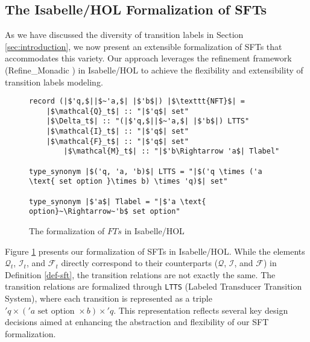 \documentclass[a4paper,UKenglish,cleveref, autoref, anonymous, thm-restate]{lipics-v2021}
\begin{document}





\subsection{The Isabelle/HOL Formalization of SFTs}

As we have discussed the diversity of transition labels in Section \ref{sec:introduction}, we now present an extensible formalization of SFTs that accommodates this variety. Our approach leverages the refinement framework (Refine\_Monadic \cite{Refine_Monadic-AFP}) in Isabelle/HOL to achieve the flexibility and extensibility of transition labels modeling.

\begin{figure}[hbt!]
	\begin{lstlisting}
record (|$'q,$||$~'a,$| |$'b$|) |$\texttt{NFT}$| =
	|$\mathcal{Q}_t$| :: "|$'q$| set"
	|$\Delta_t$| :: "(|$'q,$||$~'a,$| |$'b$|) LTTS"
	|$\mathcal{I}_t$| :: "|$'q$| set"
	|$\mathcal{F}_t$| :: "|$'q$| set"
        |$\mathcal{M}_t$| :: "|$'b\Rightarrow 'a$| Tlabel"
        
type_synonym |$('q, 'a, 'b)$| LTTS = "|$('q \times ('a \text{ set option }\times b) \times 'q)$| set"

type_synonym |$'a$| Tlabel = "|$'a \text{ option}~\Rightarrow~'b$ set option"
	\end{lstlisting}
\caption{The formalization of $FTs$ in Isabelle/HOL}
\label{fig-def-FT}
\end{figure}

Figure \ref{fig-def-FT} presents our formalization of SFTs in Isabelle/HOL. While the elements $\mathcal{Q}_t$, $\mathcal{I}_t$, and $\mathcal{F}_t$ directly correspond to their counterparts ($\mathcal{Q}$, $\mathcal{I}$, and $\mathcal{F}$) in Definition \ref{def-sft}, the transition relations are not exactly the same.
%
The transition relations are formalized through \texttt{LTTS} (Labeled Transducer Transition System), where each transition is represented as a triple $'q \times ('a \text{ set option }\times b) \times 'q$. This representation reflects several key design decisions aimed at enhancing the abstraction and flexibility of our SFT formalization.
\end{document}
